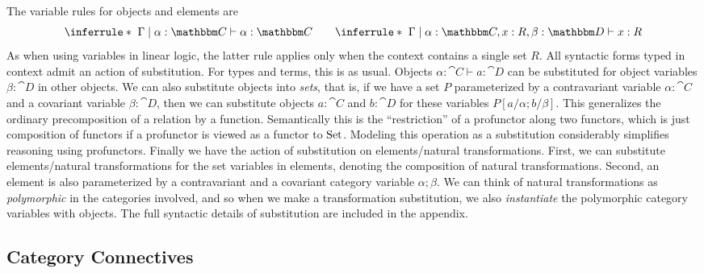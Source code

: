 \documentclass{llncs}
\begin{document}

The variable rules for objects and elements are 
\[
\inferrule*{~}{ \Gamma \pipe \alpha : \cat C \vdash \alpha : \cat C}
\qquad
\inferrule*{~}{ \Gamma \pipe \alpha : \cat C, x : R, \beta : \cat D \vdash x : R}
\]
As when using variables in linear logic, the latter rule applies only when the context
contains a single set $R$.  All syntactic forms typed in context admit
an action of substitution.  For types and terms, this is as
usual. Objects $\alpha:\cat C \vdash a : \cat D$ can be substituted for
object variables $\beta : \cat D$ in other objects. We can also
substitute objects into \emph{sets}, that is, if we have a set $P$
parameterized by a contravariant variable $\alpha : \cat C$ and a
covariant variable $\beta: \cat D$, then we can substitute objects $a :
\cat C$ and $b : \cat D$ for these variables $P[a/\alpha;b/\beta]$. This
generalizes the ordinary precomposition of a relation by a function.
Semantically this is the ``restriction'' of a profunctor along two
functors, which is just composition of functors if a profunctor is
viewed as a functor to $\textrm{Set}$. Modeling this operation as a substitution
considerably simplifies reasoning using profunctors.
%
Finally we have the action of substitution on elements/natural transformations.
First, we can substitute elements/natural transformations for the set
variables in elements, denoting the composition of natural
transformations.  Second, an element is also parameterized
by a contravariant and a covariant category variable $\alpha;\beta$. We
can think of natural transformations as \emph{polymorphic} in the
categories involved, and so when we make a transformation substitution,
we also \emph{instantiate} the polymorphic category variables with
objects.
%
The full syntactic details of substitution are included in the appendix.

\subsection{Category Connectives}
\end{document}
